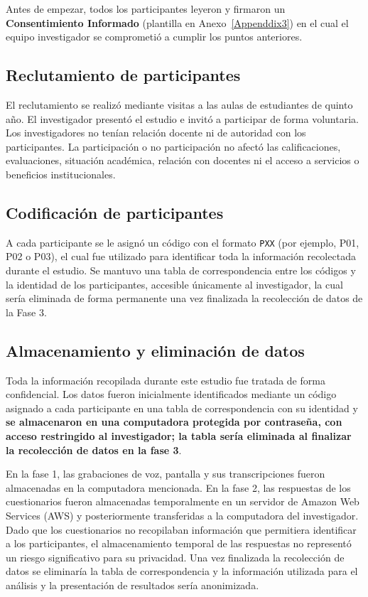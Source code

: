 Antes de empezar, todos los participantes leyeron y firmaron un
\textbf{Consentimiento Informado} (plantilla en Anexo~\ref{Appenddix3}) en el cual el equipo investigador se comprometió a
cumplir los puntos anteriores.

\subsection{Reclutamiento de participantes}

El reclutamiento se realizó mediante visitas a las aulas de estudiantes de quinto año. El investigador presentó el estudio e invitó a participar de forma voluntaria. Los investigadores no tenían relación docente ni de autoridad con los participantes. La participación o no participación no afectó las calificaciones, evaluaciones, situación académica, relación con docentes ni el acceso a servicios o beneficios institucionales.

\subsection{Codificación de participantes}

A cada participante se le asignó un código con el formato \texttt{PXX} (por ejemplo, P01, P02 o P03), el cual fue utilizado para identificar toda la información recolectada durante el estudio. Se mantuvo una tabla de correspondencia entre los códigos y la identidad de los participantes, accesible únicamente al investigador, la cual sería eliminada de forma permanente una vez finalizada la recolección de datos de la Fase 3.

\subsection{Almacenamiento y eliminación de datos}

Toda la información recopilada durante este estudio fue tratada de forma confidencial. Los datos fueron inicialmente identificados mediante un código asignado a cada participante en una tabla de correspondencia con su identidad y \textbf{se almacenaron en una computadora protegida por contraseña, con acceso restringido al investigador; la tabla sería eliminada al finalizar la recolección de datos en la fase 3}.

En la fase 1, las grabaciones de voz, pantalla y sus transcripciones fueron almacenadas en la computadora mencionada. En la fase 2, las respuestas de los cuestionarios fueron almacenadas temporalmente en un servidor de Amazon Web Services (AWS) y posteriormente transferidas a la computadora del investigador. Dado que los cuestionarios no recopilaban información que permitiera identificar a los participantes, el almacenamiento temporal de las respuestas no representó un riesgo significativo para su privacidad. Una vez finalizada la recolección de datos se eliminaría la tabla de correspondencia y la información utilizada para el análisis y la presentación de resultados sería anonimizada.

